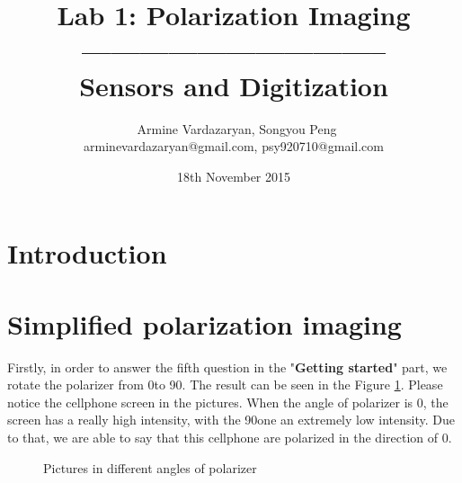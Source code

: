 \documentclass[english]{article}
\begin{document}
\title{Lab 1: Polarization Imaging\\ -------------------------------- \\ \Large Sensors and Digitization}
\author{ \ Armine Vardazaryan, Songyou Peng \\ arminevardazaryan@gmail.com, psy920710@gmail.com}
\date{18th November 2015}

\maketitle

\section{Introduction}

\section{Simplified polarization imaging}
Firstly, in order to answer the fifth question in the "\textbf{Getting started}" part, we rotate the polarizer from 0\textdegree to 90\textdegree. 
The result can be seen in the Figure \ref{fig:one}. Please notice the cellphone screen in the pictures. When the angle of polarizer is 0\textdegree, the screen has a really high intensity, with the 90\textdegree one an extremely low intensity. Due to that, we are able to say that this cellphone are polarized in the direction of 0\textdegree.\\

\begin{figure}[H]
	\centering
	\caption{Pictures in different angles of polarizer}
	\label{fig:one}
\end{figure}
\end{document}
